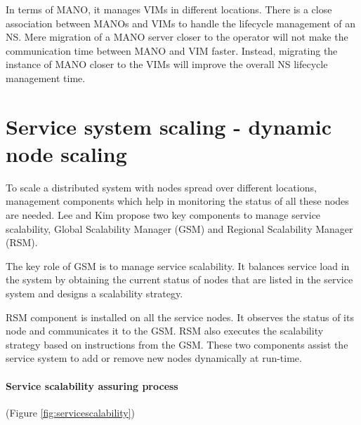 In terms of MANO, it manages VIMs in different locations. There is a close association between MANOs and VIMs to handle the lifecycle management of an NS.
Mere migration of a MANO server closer to the operator will not make the communication time between MANO and VIM faster. Instead, migrating the instance of MANO closer to the VIMs will improve the overall NS lifecycle management time.

\section{Service system scaling - dynamic node scaling}

To scale a distributed system with nodes spread over different locations, management components which help in monitoring the status of all these nodes are needed. Lee and Kim \cite{lee_software_2010} propose two key components to manage service scalability, Global Scalability Manager (GSM) and Regional Scalability Manager (RSM).

The key role of GSM is to manage service scalability. It balances service load in the system by obtaining the current status of nodes that are listed in the service system and designs a scalability strategy.

RSM component is installed on all the service nodes. It observes the status of its node and communicates it to the GSM. RSM also executes the scalability strategy based on instructions from the GSM. These two components assist the service system to add or remove new nodes dynamically at run-time.

\paragraph{Service scalability assuring process} (Figure \ref{fig:servicescalability})


